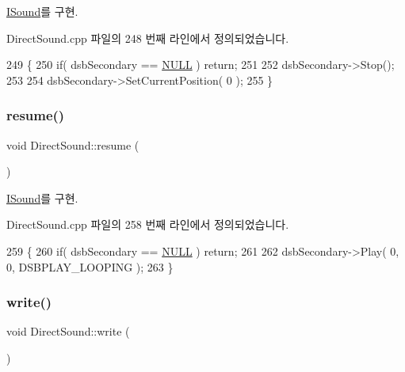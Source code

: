 \mbox{\hyperlink{class_i_sound_a7ca59c529f3abce2dd4ed8d8da243c5e}{I\+Sound}}를 구현.



Direct\+Sound.\+cpp 파일의 248 번째 라인에서 정의되었습니다.


\begin{DoxyCode}
249 \{
250     \textcolor{keywordflow}{if}( dsbSecondary == \mbox{\hyperlink{getopt1_8c_a070d2ce7b6bb7e5c05602aa8c308d0c4}{NULL}} ) \textcolor{keywordflow}{return};
251     
252     dsbSecondary->Stop();
253     
254     dsbSecondary->SetCurrentPosition( 0 );
255 \}
\end{DoxyCode}
\mbox{\label{class_direct_sound_a529b060d31bb252968bc9a387a7dc9ad}} 
\subsubsection{\texorpdfstring{resume()}{resume()}}
{\footnotesize\ttfamily void Direct\+Sound\+::resume (\begin{DoxyParamCaption}{ }\end{DoxyParamCaption})\hspace{0.3cm}{\ttfamily [virtual]}}



\mbox{\hyperlink{class_i_sound_a8e0adea68f52a7f0392a3988a558aaf0}{I\+Sound}}를 구현.



Direct\+Sound.\+cpp 파일의 258 번째 라인에서 정의되었습니다.


\begin{DoxyCode}
259 \{
260     \textcolor{keywordflow}{if}( dsbSecondary == \mbox{\hyperlink{getopt1_8c_a070d2ce7b6bb7e5c05602aa8c308d0c4}{NULL}} ) \textcolor{keywordflow}{return};
261     
262     dsbSecondary->Play( 0, 0, DSBPLAY\_LOOPING );
263 \}
\end{DoxyCode}
\mbox{\label{class_direct_sound_a2e2a78f3a6719920fb2a9dfc48e4b1db}} 
\subsubsection{\texorpdfstring{write()}{write()}}
{\footnotesize\ttfamily void Direct\+Sound\+::write (\begin{DoxyParamCaption}{ }\end{DoxyParamCaption})\hspace{0.3cm}{\ttfamily [virtual]}}



